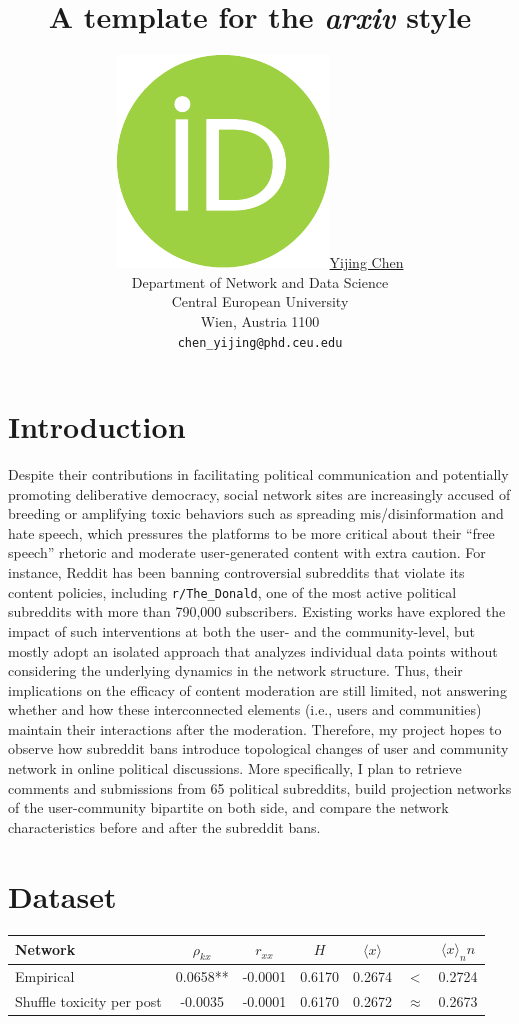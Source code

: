 \documentclass{article}
\title{A template for the \emph{arxiv} style}
\author{ \href{https://orcid.org/0000-0002-9311-6357}{\includegraphics[scale=0.06]{orcid.pdf}\hspace{1mm}Yijing Chen}\\
	Department of Network and Data Science\\
	Central European University\\
	Wien, Austria 1100 \\
	\texttt{chen\_yijing@phd.ceu.edu} \\
}
\begin{document}
\maketitle

\begin{abstract}
	\lipsum[1]
\end{abstract}





\section{Introduction}

Despite their contributions in facilitating political communication and potentially promoting deliberative democracy, social network sites are increasingly accused of breeding or amplifying toxic behaviors such as spreading mis/disinformation and hate speech, which pressures the platforms to be more critical about their ``free speech'' rhetoric and moderate user-generated content with extra caution. For instance, Reddit has been banning controversial subreddits that violate its content policies, including {\tt r/The\_Donald}, one of the most active political subreddits with more than 790,000 subscribers. Existing works have explored the impact of such interventions at both the user- and the community-level\cite{copland2020reddit, chandrasekharan2017you}, but mostly adopt an isolated approach that analyzes individual data points without considering the underlying dynamics in the network structure. Thus, their implications on the efficacy of content moderation are still limited, not answering whether and how these interconnected elements (i.e., users and communities) maintain their interactions after the moderation. Therefore, my project hopes to observe how subreddit bans introduce topological changes of user and community network in online political discussions. More specifically, I plan to retrieve comments and submissions from 65 political subreddits\cite{rajadesingan2020quick}, build projection networks of the user-community bipartite on both side, and compare the network characteristics before and after the subreddit bans.


\section{Dataset}

\begin{table}[]
\begin{tabular}{l|cccccc}
Network                   & $\rho_{kx}$ & $r_{xx}$ & $H$    & $\langle x \rangle$ &             & $\langle x \rangle_nn$ \\ \hline
Empirical                 & 0.0658**    & -0.0001  & 0.6170 & 0.2674              & \textless{} & 0.2724                 \\
Shuffle toxicity per post & -0.0035     & -0.0001  & 0.6170 & 0.2672              & $\approx$   & 0.2673                
\end{tabular}
\end{table}
\end{document}
